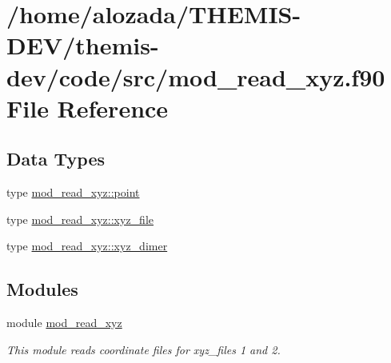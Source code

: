 \hypertarget{mod__read__xyz_8f90}{}\section{/home/alozada/\+T\+H\+E\+M\+I\+S-\/\+D\+E\+V/themis-\/dev/code/src/mod\+\_\+read\+\_\+xyz.f90 File Reference}
\label{mod__read__xyz_8f90}
\subsection*{Data Types}
\begin{DoxyCompactItemize}
\item 
type \hyperlink{structmod__read__xyz_1_1point}{mod\+\_\+read\+\_\+xyz\+::point}
\item 
type \hyperlink{structmod__read__xyz_1_1xyz__file}{mod\+\_\+read\+\_\+xyz\+::xyz\+\_\+file}
\item 
type \hyperlink{structmod__read__xyz_1_1xyz__dimer}{mod\+\_\+read\+\_\+xyz\+::xyz\+\_\+dimer}
\end{DoxyCompactItemize}
\subsection*{Modules}
\begin{DoxyCompactItemize}
\item 
module \hyperlink{namespacemod__read__xyz}{mod\+\_\+read\+\_\+xyz}
\begin{DoxyCompactList}\small\item\em This module reads coordinate files for xyz\+\_\+files 1 and 2. \end{DoxyCompactList}\end{DoxyCompactItemize}
